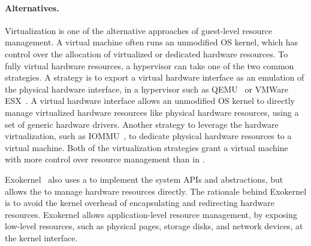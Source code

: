 \paragraph{Alternatives.}
Virtualization is one of the alternative approaches of guest-level resource management. %
A virtual machine often runs an unmodified OS kernel,
which has control over the allocation of virtualized or dedicated hardware resources.
To fully virtual hardware resources,
a hypervisor can take one of the two common strategies.
A strategy
is to export a virtual hardware interface
as an emulation of the physical hardware interface,
in a hypervisor
such as QEMU~\cite{qemu} or VMWare ESX~\cite{wldspurger02vmware-esx}.
A virtual hardware interface
allows an unmodified OS kernel to
directly manage virtualized hardware resources like physical hardware resources,
using a set of generic hardware drivers.
Another strategy to leverage the hardware virtualization,
such as IOMMU~\cite{VT-d},
to dedicate physical hardware resources
to a virtual machine.
Both of the virtualization strategies grant a virtual machine with more control over resource management %
than \thelibos{} in \graphene{}.




Exokernel~\cite{engler95exokernel} also uses a \libos{}
to implement the system APIs and abstractions, but allows the \libos{} to manage hardware resources directly.
The rationale behind Exokernel is to avoid the kernel overhead of encapsulating and redirecting hardware resources.
Exokernel allows application-level resource management, by exposing low-level resources, such as physical pages, storage disks, and network devices, at the kernel interface.



















